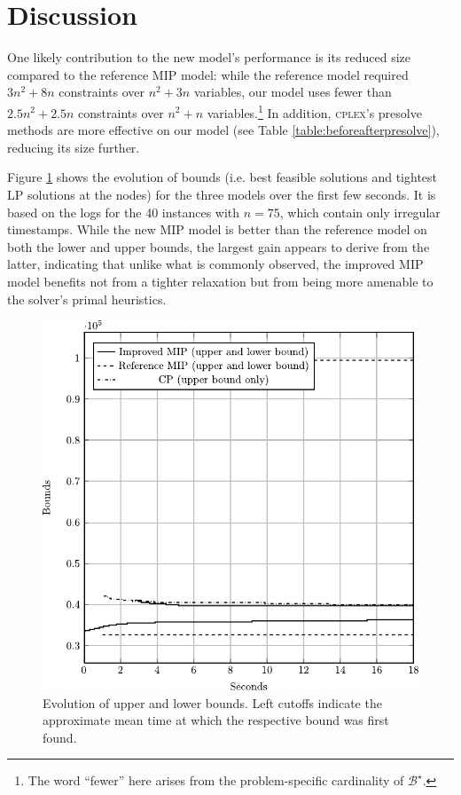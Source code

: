 \documentclass[oribibl]{llncs}
\begin{document}
\section{Discussion}
\label{sec:discussion}


One likely contribution to the new model's performance is its reduced
size compared to the reference MIP model: while the reference model
required $3n^2 + 8n$ constraints over $n^2 + 3n$ variables, our
model uses fewer than $2.5n^2 + 2.5n$ constraints over $n^2 + n$
variables.\footnote{The word ``fewer'' here arises from the problem-specific
cardinality of $\mathcal{B}^\star$.} In addition, \textsc{cplex}'s
presolve methods are more effective on our model (see Table
\ref{table:beforeafterpresolve}), reducing its size further.

Figure \ref{fig:lbubcomp} shows the evolution of bounds (i.e. best feasible
solutions and tightest LP solutions at the nodes) for the three
models over the first few seconds. It is based on the logs for
the 40 instances with $n = 75$, which contain only irregular timestamps.
While the new MIP model is better than the reference model on both the lower
and upper bounds, the largest gain appears to derive from the latter,
indicating that unlike what is commonly observed, the improved MIP model
benefits not from a tighter relaxation but from being more amenable to
the solver's primal heuristics.

\begin{figure} %
\centering
\includegraphics[height=0.3\textheight]{lbubcomp.pdf}
\caption{Evolution of upper and lower bounds.
Left cutoffs indicate the approximate mean time at which the
respective bound was first found.}
\label{fig:lbubcomp}
\end{figure}
\end{document}
